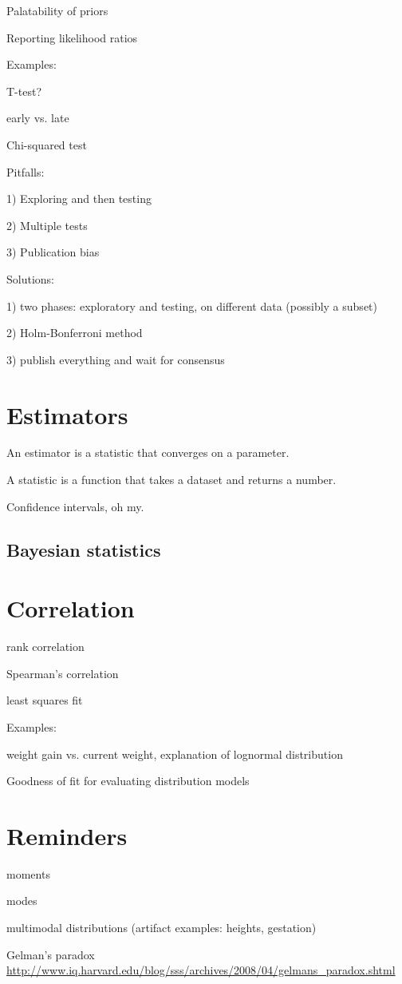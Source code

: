 \documentclass[10pt]{book}
\begin{document}
Palatability of priors

Reporting likelihood ratios


Examples:

   T-test?

   early vs. late

   Chi-squared test

   

Pitfalls:

1) Exploring and then testing

2) Multiple tests

3) Publication bias


Solutions:

1) two phases: exploratory and testing, on different data (possibly a subset)

2) Holm-Bonferroni method

3) publish everything and wait for consensus




\chapter{Estimators}

An estimator is a statistic that converges on a parameter.

A statistic is a function that takes a dataset and returns a number.

Confidence intervals, oh my.


\section{Bayesian statistics}



\chapter{Correlation}

rank correlation

Spearman's correlation

least squares fit

Examples:

    weight gain vs. current weight, explanation of lognormal distribution

Goodness of fit for evaluating distribution models


\chapter{Reminders}

moments

modes

   multimodal distributions (artifact examples: heights, gestation)

Gelman's paradox
\url{http://www.iq.harvard.edu/blog/sss/archives/2008/04/gelmans_paradox.shtml}

\printindex

\clearemptydoublepage
\end{document}
